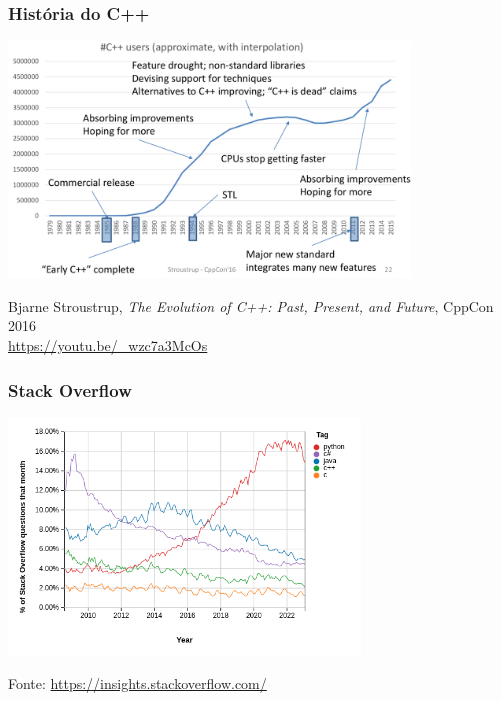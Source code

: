 \documentclass[xcolor={usenames,dvipsnames},10pt,presentation,aspectratio=169]{beamer}
\begin{document}
\begin{frame}
  \frametitle{História do C++}
  \begin{center}
	\includegraphics[width=0.8\textwidth]{cppsuccess.png}
  \end{center}
  {\footnotesize Bjarne Stroustrup, \emph{The Evolution of C++: Past, Present, and Future}, CppCon 2016 \\ \url{https://youtu.be/\_wzc7a3McOs}}
\end{frame}
\begin{frame}
  \frametitle{Stack Overflow}
  \vspace{-2mm}
  \begin{center}
	\includegraphics[width=0.7\textwidth]{stackoverflow.png}
  \end{center}
  \vspace{-7mm}
  {\footnotesize Fonte: \url{https://insights.stackoverflow.com/}}
\end{frame}
\end{document}
